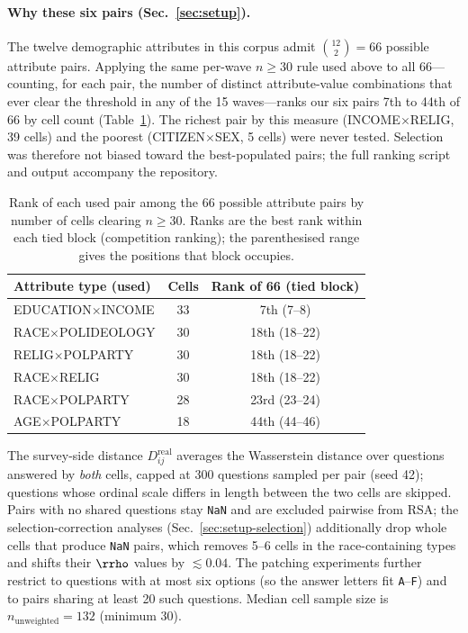 \paragraph{Why these six pairs (Sec.~\ref{sec:setup}).} The twelve
demographic attributes in this corpus admit $\binom{12}{2}=66$ possible
attribute pairs. Applying the same per-wave $n\geq30$ rule used above to
all 66---counting, for each pair, the number of distinct attribute-value
combinations that ever clear the threshold in any of the 15 waves---ranks
our six pairs 7th to 44th of 66 by cell count
(Table~\ref{tab:pair-rank}). The richest pair by this measure
(INCOME$\times$RELIG, 39 cells) and the poorest (CITIZEN$\times$SEX, 5
cells) were never tested. Selection was therefore not biased toward the
best-populated pairs; the full ranking script and output accompany the
repository.

\begin{table}[h]
\centering
\begin{tabular}{lcc}
\toprule
Attribute type (used) & Cells & Rank of 66 (tied block) \\
\midrule
EDUCATION$\times$INCOME  & 33 & 7th (7--8) \\
RACE$\times$POLIDEOLOGY  & 30 & 18th (18--22) \\
RELIG$\times$POLPARTY    & 30 & 18th (18--22) \\
RACE$\times$RELIG        & 30 & 18th (18--22) \\
RACE$\times$POLPARTY     & 28 & 23rd (23--24) \\
AGE$\times$POLPARTY      & 18 & 44th (44--46) \\
\bottomrule
\end{tabular}
\caption{Rank of each used pair among the 66 possible attribute pairs by
number of cells clearing $n\geq30$. Ranks are the best rank within each
tied block (competition ranking); the parenthesised range gives the
positions that block occupies.}
\label{tab:pair-rank}
\end{table}

The survey-side distance $D^{\mathrm{real}}_{ij}$ averages the
Wasserstein distance over questions answered by \emph{both} cells, capped
at $300$ questions sampled per pair (seed 42); questions whose ordinal
scale differs in length between the two cells are skipped. Pairs with no
shared questions stay \texttt{NaN} and are excluded pairwise from RSA; the
selection-correction analyses (Sec.~\ref{sec:setup-selection}) additionally
drop whole cells that produce \texttt{NaN} pairs, which removes 5--6 cells
in the race-containing types and shifts their $\rrho$ values by
$\lesssim0.04$. The patching experiments further restrict to questions
with at most six options (so the answer letters fit \texttt{A}--\texttt{F})
and to pairs sharing at least 20 such questions. Median cell sample size
is $n_{\text{unweighted}}=132$ (minimum 30).

